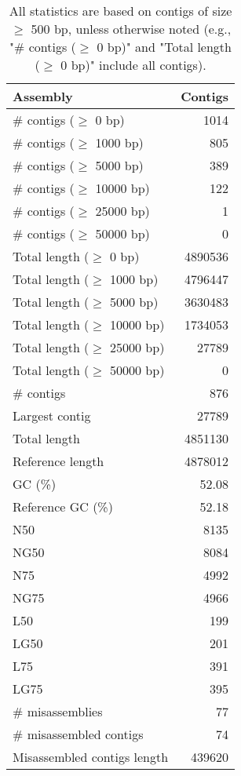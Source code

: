 \documentclass[12pt,a4paper]{article}
\begin{document}
\begin{table}[ht]
\begin{center}
\caption{All statistics are based on contigs of size $\geq$ 500 bp, unless otherwise noted (e.g., "\# contigs ($\geq$ 0 bp)" and "Total length ($\geq$ 0 bp)" include all contigs).}
\begin{tabular}{|l*{1}{|r}|}
\hline
Assembly & Contigs \\ \hline
\# contigs ($\geq$ 0 bp) & 1014 \\ \hline
\# contigs ($\geq$ 1000 bp) & 805 \\ \hline
\# contigs ($\geq$ 5000 bp) & 389 \\ \hline
\# contigs ($\geq$ 10000 bp) & 122 \\ \hline
\# contigs ($\geq$ 25000 bp) & 1 \\ \hline
\# contigs ($\geq$ 50000 bp) & 0 \\ \hline
Total length ($\geq$ 0 bp) & 4890536 \\ \hline
Total length ($\geq$ 1000 bp) & 4796447 \\ \hline
Total length ($\geq$ 5000 bp) & 3630483 \\ \hline
Total length ($\geq$ 10000 bp) & 1734053 \\ \hline
Total length ($\geq$ 25000 bp) & 27789 \\ \hline
Total length ($\geq$ 50000 bp) & 0 \\ \hline
\# contigs & 876 \\ \hline
Largest contig & 27789 \\ \hline
Total length & 4851130 \\ \hline
Reference length & 4878012 \\ \hline
GC (\%) & 52.08 \\ \hline
Reference GC (\%) & 52.18 \\ \hline
N50 & 8135 \\ \hline
NG50 & 8084 \\ \hline
N75 & 4992 \\ \hline
NG75 & 4966 \\ \hline
L50 & 199 \\ \hline
LG50 & 201 \\ \hline
L75 & 391 \\ \hline
LG75 & 395 \\ \hline
\# misassemblies & 77 \\ \hline
\# misassembled contigs & 74 \\ \hline
Misassembled contigs length & 439620 \\ \hline

\end{tabular}
\end{center}
\end{table}
\end{document}
